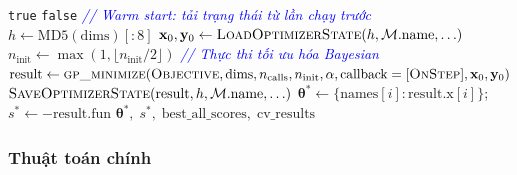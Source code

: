 \documentclass[12pt,a4paper]{article}
\begin{document}
\begin{algorithm}[H]
\begin{algorithmic}[1]
            \State \Return \texttt{true} 
        \EndIf
    \EndIf
    \State \Return \texttt{false} 
\EndFunction
\Statex
\Statex \textcolor{blue}{\textit{// Warm start: tải trạng thái từ lần chạy trước}}
\State $h \gets \text{MD5}(\text{dims})[:8]$
\State $\mathbf{x}_0, \mathbf{y}_0 \gets \textsc{LoadOptimizerState}(h, \mathcal{M}.\text{name}, \ldots)$
    \State $n_{\text{init}} \gets \max(1, \lfloor n_{\text{init}} / 2 \rfloor)$ 
\EndIf
\Statex \textcolor{blue}{\textit{// Thực thi tối ưu hóa Bayesian}}
\State $\text{result} \gets \textsc{gp\_minimize}(\textsc{Objective}, \text{dims}, n_{\text{calls}}, n_{\text{init}}, \alpha, \text{callback}=[\textsc{OnStep}], \mathbf{x}_0, \mathbf{y}_0)$
\State $\textsc{SaveOptimizerState}(\text{result}, h, \mathcal{M}.\text{name}, \ldots)$ 
\State $\boldsymbol{\theta}^* \gets \{\text{names}[i]: \text{result.x}[i]\}$;\quad $s^* \gets -\text{result.fun}$
\State \Return $\boldsymbol{\theta}^*,\; s^*,\; \text{best\_all\_scores},\; \text{cv\_results}$
\end{algorithmic}
\end{algorithm}

\subsubsection{Thuật toán chính}
\end{document}
